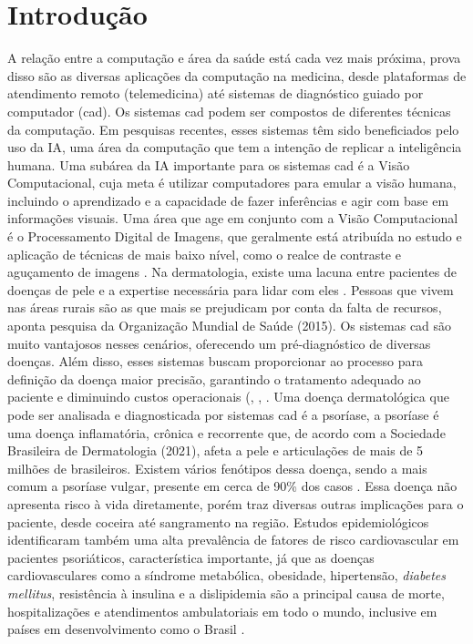 \section{Introdução}
A relação entre a computação e área da saúde está cada vez mais próxima, prova disso são as diversas aplicações da computação na medicina, desde plataformas de atendimento remoto (telemedicina) até sistemas de diagnóstico guiado por computador (\gls{cad}).
Os sistemas \gls{cad} podem ser compostos de diferentes técnicas da computação. Em pesquisas recentes, esses sistemas têm sido beneficiados pelo uso da \ac{IA}, uma área da computação que tem a intenção de replicar a inteligência humana. Uma subárea da \acs{IA} importante para os sistemas \gls{cad} é a Visão Computacional, cuja meta é utilizar computadores para emular a visão humana, incluindo o aprendizado e a capacidade de fazer inferências e agir com base em informações visuais. Uma área que age em conjunto com a Visão Computacional é o Processamento Digital de Imagens, que geralmente está atribuída no estudo e aplicação de técnicas de mais baixo nível, como o realce de contraste e aguçamento de imagens \cite{gonzalez2008digital}.
Na dermatologia, existe uma lacuna entre pacientes de doenças de pele e a expertise necessária para lidar com eles \cite{Hameed2019}. Pessoas que vivem nas áreas rurais são as que mais se prejudicam por conta da falta de recursos, aponta pesquisa da Organização Mundial de Saúde (2015). Os sistemas \gls{cad} são muito vantajosos nesses cenários, oferecendo um pré-diagnóstico de diversas doenças. Além disso, esses sistemas buscam proporcionar ao processo para definição da doença maior precisão, garantindo o tratamento adequado ao paciente e diminuindo custos operacionais (\cite{Hameed2019}, \cite{DAS2020119556}, \cite{Arora2021}. Uma doença dermatológica que pode ser analisada e diagnosticada por sistemas \gls{cad} é a psoríase, a psoríase é uma doença inflamatória, crônica e recorrente que, de acordo com a Sociedade Brasileira de Dermatologia (2021), afeta a pele e articulações de mais de 5 milhões de brasileiros. Existem vários fenótipos dessa doença, sendo a mais comum a psoríase vulgar, presente em cerca de 90\% dos casos \cite{Griffiths2007}. Essa doença não apresenta risco à vida diretamente, porém traz diversas outras implicações para o paciente, desde coceira até sangramento na região. Estudos epidemiológicos identificaram também uma alta prevalência de fatores de risco cardiovascular em pacientes psoriáticos, característica importante, já que as doenças cardiovasculares como a síndrome metabólica, obesidade, hipertensão, \textit{diabetes mellitus}, resistência à insulina e a dislipidemia \cite{Miller2013} são a principal causa de morte, hospitalizações e atendimentos ambulatoriais em todo o mundo, inclusive em países em desenvolvimento como o Brasil \cite{Barroso2021}. 
